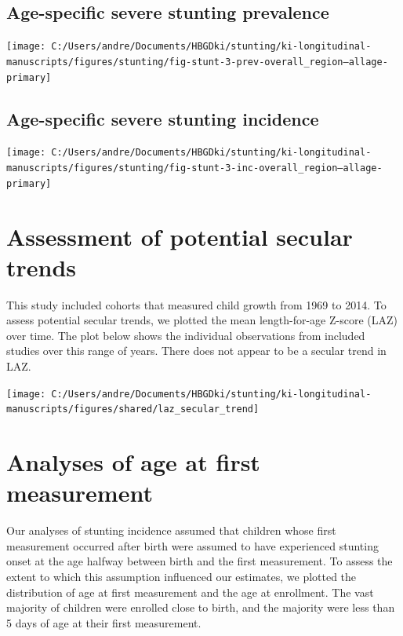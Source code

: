 \documentclass[9pt,]{book}
\begin{document}
\section{Age-specific severe stunting
prevalence}\label{age-specific-severe-stunting-prevalence}

\texttt{[image: C:/Users/andre/Documents/HBGDki/stunting/ki-longitudinal-manuscripts/figures/stunting/fig-stunt-3-prev-overall\_region--allage-primary]}

\section{Age-specific severe stunting
incidence}\label{age-specific-severe-stunting-incidence}

\texttt{[image: C:/Users/andre/Documents/HBGDki/stunting/ki-longitudinal-manuscripts/figures/stunting/fig-stunt-3-inc-overall\_region--allage-primary]}

\chapter{Assessment of potential secular trends}\label{secular-trends}

\raggedright

This study included cohorts that measured child growth from 1969 to
2014. To assess potential secular trends, we plotted the mean
length-for-age Z-score (LAZ) over time. The plot below shows the
individual observations from included studies over this range of years.
There does not appear to be a secular trend in LAZ.

\texttt{[image: C:/Users/andre/Documents/HBGDki/stunting/ki-longitudinal-manuscripts/figures/shared/laz\_secular\_trend]}

\chapter{Analyses of age at first measurement}\label{age-meas}

\raggedright

Our analyses of stunting incidence assumed that children whose first
measurement occurred after birth were assumed to have experienced
stunting onset at the age halfway between birth and the first
measurement. To assess the extent to which this assumption influenced
our estimates, we plotted the distribution of age at first measurement
and the age at enrollment. The vast majority of children were enrolled
close to birth, and the majority were less than 5 days of age at their
first measurement.
\end{document}
